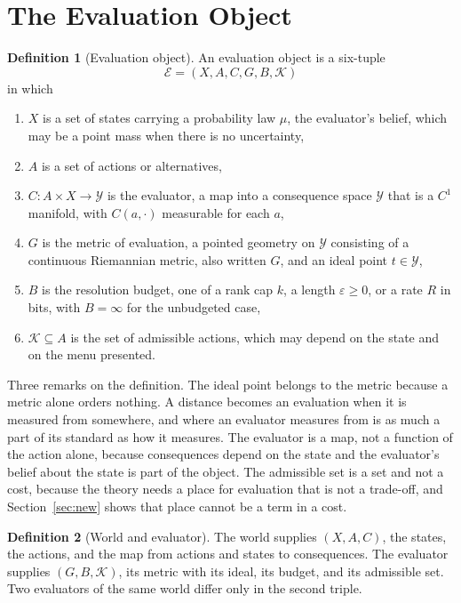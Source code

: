\documentclass[11pt]{article}
\theoremstyle{definition}
\newtheorem{definition}{Definition}
\theoremstyle{remark}
\newcommand{\Ev}{\mathcal{E}}
\newcommand{\K}{\mathcal{K}}
\newcommand{\Y}{\mathcal{Y}}
\begin{document}
\section{The Evaluation Object}
\label{sec:object}

\begin{definition}[Evaluation object]
\label{def:object}
An evaluation object is a six-tuple
\[
\Ev=(X,A,C,G,B,\K)
\]
in which
\begin{enumerate}
\item[(i)] $X$ is a set of states carrying a probability law $\mu$, the evaluator's belief, which may be a point mass when there is no uncertainty,
\item[(ii)] $A$ is a set of actions or alternatives,
\item[(iii)] $C:A\times X\to\Y$ is the evaluator, a map into a consequence space $\Y$ that is a $C^{1}$ manifold, with $C(a,\cdot)$ measurable for each $a$,
\item[(iv)] $G$ is the metric of evaluation, a pointed geometry on $\Y$ consisting of a continuous Riemannian metric, also written $G$, and an ideal point $t\in\Y$,
\item[(v)] $B$ is the resolution budget, one of a rank cap $k$, a length $\varepsilon\ge0$, or a rate $R$ in bits, with $B=\infty$ for the unbudgeted case,
\item[(vi)] $\K\subseteq A$ is the set of admissible actions, which may depend on the state and on the menu presented.
\end{enumerate}
\end{definition}

Three remarks on the definition.
The ideal point belongs to the metric because a metric alone orders nothing.
A distance becomes an evaluation when it is measured from somewhere, and where an evaluator measures from is as much a part of its standard as how it measures.
The evaluator is a map, not a function of the action alone, because consequences depend on the state and the evaluator's belief about the state is part of the object.
The admissible set is a set and not a cost, because the theory needs a place for evaluation that is not a trade-off, and Section~\ref{sec:new} shows that place cannot be a term in a cost.

\begin{definition}[World and evaluator]
\label{def:split}
The world supplies $(X,A,C)$, the states, the actions, and the map from actions and states to consequences.
The evaluator supplies $(G,B,\K)$, its metric with its ideal, its budget, and its admissible set.
Two evaluators of the same world differ only in the second triple.
\end{definition}
\end{document}

